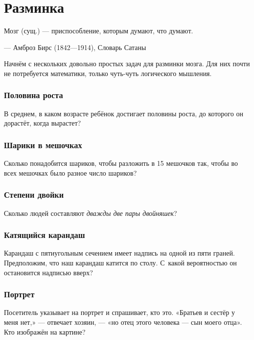 \chapter{Разминка}


\setlength{\epigraphwidth}{.80\textwidth}
\epigraph{Мозг (сущ.) --- приспособление, которым думают, что думают.}{--- Амброз Бирс (1842---1914), Словарь Сатаны}

Начнём с нескольких довольно простых задач для разминки мозга.
Для них почти не потребуется математики, только чуть-чуть логического мышления.

\subsection*{Половина роста}


В среднем, в каком возрасте ребёнок достигает половины роста, до которого он дорастёт, когда вырастет?

\subsection*{Шарики в мешочках}

Сколько понадобится шариков, чтобы разложить в 15 мешочков так,
чтобы во всех мешочках было разное число шариков?

\subsection*{Степени двойки}

Сколько людей составляют \emph{дважды две пары двойняшек}?

\subsection*{Катящийся карандаш}

Карандаш с пятиугольным сечением имеет надпись на одной из пяти граней.
Предположим, что наш карандаш катится по столу.
С~какой вероятностью он остановится надписью вверх?

\subsection*{Портрет}

Посетитель указывает на портрет и спрашивает, кто это. 
«Братьев и сестёр у меня нет,» --- отвечает хозяин, --- «но отец этого человека --- сын моего отца».
Кто изображён на картине?

